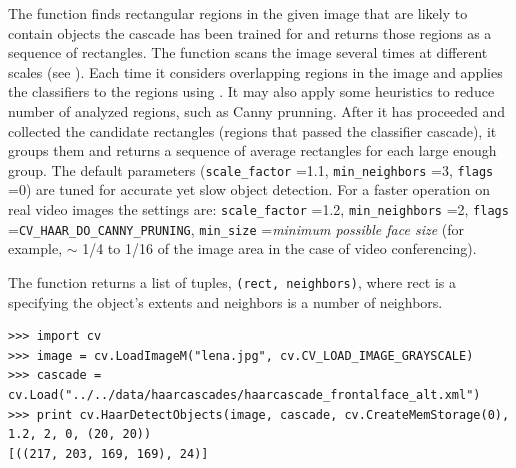 The function finds rectangular regions in the given image that are likely to contain objects the cascade has been trained for and returns those regions as a sequence of rectangles. The function scans the image several times at different scales (see ). Each time it considers overlapping regions in the image and applies the classifiers to the regions using . It may also apply some heuristics to reduce number of analyzed regions, such as Canny prunning. After it has proceeded and collected the candidate rectangles (regions that passed the classifier cascade), it groups them and returns a sequence of average rectangles for each large enough group. The default parameters (\texttt{scale\_factor} =1.1, \texttt{min\_neighbors} =3, \texttt{flags} =0) are tuned for accurate yet slow object detection. For a faster operation on real video images the settings are: \texttt{scale\_factor} =1.2, \texttt{min\_neighbors} =2, \texttt{flags} =\texttt{CV\_HAAR\_DO\_CANNY\_PRUNING}, \texttt{min\_size} =\textit{minimum possible face size} (for example, $\sim$ 1/4 to 1/16 of the image area in the case of video conferencing).

\ifPy
The function returns a list of tuples, \texttt{(rect, neighbors)}, where rect is a  specifying the object's extents
and neighbors is a number of neighbors.

\begin{lstlisting}
>>> import cv
>>> image = cv.LoadImageM("lena.jpg", cv.CV_LOAD_IMAGE_GRAYSCALE)
>>> cascade = cv.Load("../../data/haarcascades/haarcascade_frontalface_alt.xml")
>>> print cv.HaarDetectObjects(image, cascade, cv.CreateMemStorage(0), 1.2, 2, 0, (20, 20))
[((217, 203, 169, 169), 24)]
\end{lstlisting}
\fi


